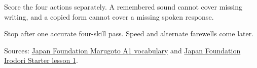 Score the four actions separately. A remembered sound cannot cover missing writing, and a copied form cannot cover a missing spoken response.

\begin{tcolorbox}[breakable,colback=teal!4,colframe=teal!35!black,title={Before you move on}]
Stop after one accurate four-skill pass. Speed and alternate farewells come later.

Sources: \href{https://words.marugotoweb.jp/search\_detail.php?cd=1\&id=435\&lang=en\&lv=A1\&source=cando}{Japan Foundation Marugoto A1 vocabulary} and \href{https://www.irodori.jpf.go.jp/assets/data/starter/pdf/X\_L01\_au.pdf}{Japan Foundation Irodori Starter lesson 1}.
\end{tcolorbox}
